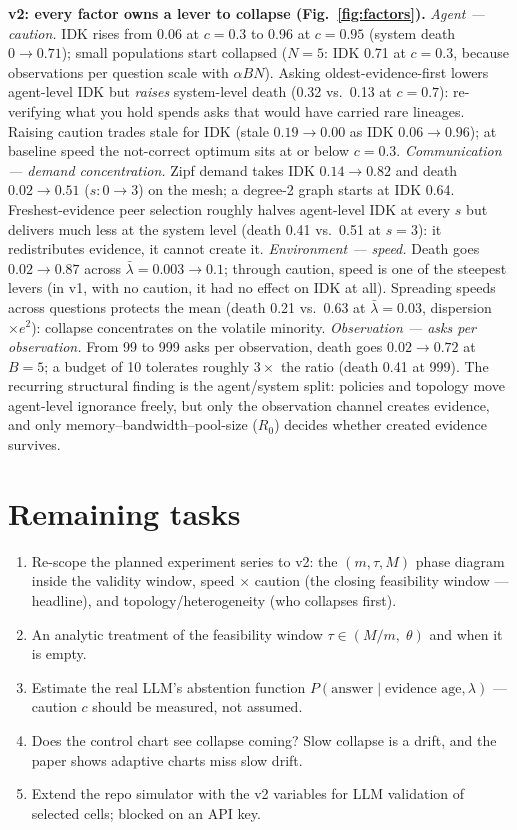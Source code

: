 \documentclass[10pt,twocolumn]{article}
\begin{document}
\textbf{v2: every factor owns a lever to collapse
(Fig.~\ref{fig:factors}).} \emph{Agent --- caution.} IDK rises from 0.06
at $c=0.3$ to 0.96 at $c=0.95$ (system death $0\to0.71$); small
populations start collapsed ($N{=}5$: IDK 0.71 at $c=0.3$, because
observations per question scale with $\alpha BN$). Asking
oldest-evidence-first lowers agent-level IDK but \emph{raises}
system-level death (0.32 vs.\ 0.13 at $c=0.7$): re-verifying what you
hold spends asks that would have carried rare lineages. Raising caution
trades stale for IDK (stale $0.19\to0.00$ as IDK $0.06\to0.96$); at
baseline speed the not-correct optimum sits at or below $c=0.3$.
\emph{Communication --- demand concentration.} Zipf demand takes IDK
$0.14\to0.82$ and death $0.02\to0.51$ ($s:0\to3$) on the mesh; a
degree-2 graph starts at IDK 0.64. Freshest-evidence peer selection
roughly halves agent-level IDK at every $s$ but delivers much less at
the system level (death 0.41 vs.\ 0.51 at $s{=}3$): it redistributes
evidence, it cannot create it. \emph{Environment --- speed.} Death goes
$0.02\to0.87$ across $\bar\lambda = 0.003\to0.1$; through caution, speed
is one of the steepest levers (in v1, with no caution, it had no effect
on IDK at all). Spreading speeds across questions protects the mean
(death 0.21 vs.\ 0.63 at $\bar\lambda=0.03$, dispersion $\times e^2$):
collapse concentrates on the volatile minority. \emph{Observation ---
asks per observation.} From 99 to 999 asks per observation, death goes
$0.02\to0.72$ at $B{=}5$; a budget of 10 tolerates roughly $3\times$ the
ratio (death 0.41 at 999). The recurring structural finding is the
agent/system split: policies and topology move agent-level ignorance
freely, but only the observation channel creates evidence, and only
memory--bandwidth--pool-size ($R_0$) decides whether created evidence
survives.

\section*{Remaining tasks}
\begin{enumerate}[leftmargin=1.4em,itemsep=1pt,topsep=1pt]
  \item Re-scope the planned experiment series to v2: the
  $(m,\tau,M)$ phase diagram inside the validity window, speed
  $\times$ caution (the closing feasibility window --- headline), and
  topology/heterogeneity (who collapses first).
  \item An analytic treatment of the feasibility window
  $\tau \in (M/m,\;\theta)$ and when it is empty.
  \item Estimate the real LLM's abstention function
  $P(\mathrm{answer}\mid\text{evidence age},\lambda)$ --- caution $c$
  should be measured, not assumed.
  \item Does the control chart see collapse coming? Slow collapse is a
  drift, and the paper shows adaptive charts miss slow drift.
  \item Extend the repo simulator with the v2 variables for LLM
  validation of selected cells; blocked on an API key.
\end{enumerate}
\end{document}
